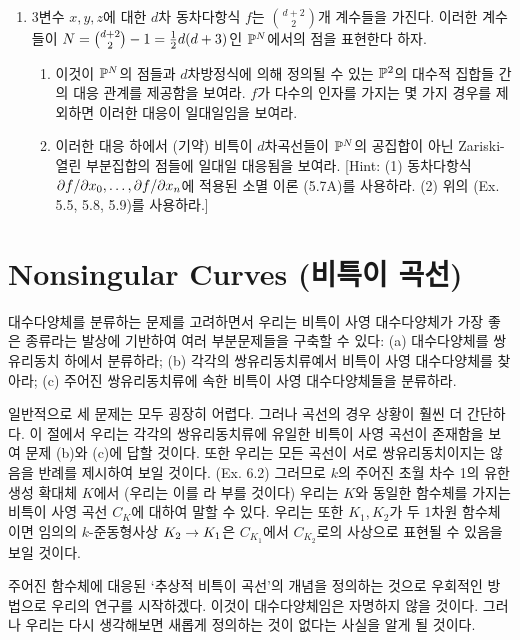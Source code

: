 \begin{enumerate}[label=\tb{5.\arabic*.},itemindent=0mm,itemsep=2mm]
	\item {} 3변수 $x,y,z$에 대한 $d$차 동차다항식 $f$는 $\binom{d+2}2$개 계수들을 가진다.
	이러한 계수들이 $N=\binom{d+2}2-1=\frac{1}{2}d(d+3)$인 $\mathbb{P}^N$에서의 점을 표현한다 하자.
	\begin{enumerate}[label=(\alph*)]
	\item 이것이 $\mathbb{P}^N$의 점들과 $d$차방정식에 의해 정의될 수 있는 $\mathbb{P}^2$의 대수적 집합들 간의 대응 관계를 제공함을 보여라.
	$f$가 다수의 인자를 가지는 몇 가지 경우를 제외하면 이러한 대응이 일대일임을 보여라.
	\item 이러한 대응 하에서 (기약) 비특이 $d$차곡선들이 $\mathbb{P}^N$의 공집합이 아닌 Zariski-열린 부분집합의 점들에
	일대일 대응됨을 보여라. [Hint: (1) 동차다항식 $\partial f/\partial x_0,\ldots,\partial f/\partial x_n$에 적용된 소멸 이론 (5.7A)를 사용하라.
	(2) 위의 (Ex. 5.5, 5.8, 5.9)를 사용하라.]
	\end{enumerate}
	\end{enumerate}
	
	
	
	\section{Nonsingular Curves (비특이 곡선)}
	대수다양체를 분류하는 문제를 고려하면서 우리는 비특이 사영 대수다양체가 가장 좋은 종류라는 발상에 기반하여
	여러 부분문제들을 구축할 수 있다: (a) 대수다양체를 쌍유리동치 하에서 분류하라;
	(b) 각각의 쌍유리동치류예서 비특이 사영 대수다양체를 찾아라; (c) 주어진 쌍유리동치류에 속한 비특이 사영 대수다양체들을 분류하라.
	
	일반적으로 세 문제는 모두 굉장히 어렵다. 그러나 곡선의 경우 상황이 훨씬 더 간단하다.
	이 절에서 우리는 각각의 쌍유리동치류에 유일한 비특이 사영 곡선이 존재함을 보여 문제 (b)와 (c)에 답할 것이다.
	또한 우리는 모든 곡선이 서로 쌍유리동치이지는 않음을 반례를 제시하여 보일 것이다. (Ex. 6.2)
	그러므로 $k$의 주어진 초월 차수 1의 유한생성 확대체 $K$에서%
	(우리는 이를 라 부를 것이다)
	우리는 $K$와 동일한 함수체를 가지는  비특이 사영 곡선 $C_K$에 대하여 말할 수 있다.
	우리는 또한 $K_1,K_2$가 두 1차원 함수체이면 임의의 $k$-준동형사상 $K_2\rightarrow K_1$은
	$C_{K_1}$에서 $C_{K_2}$로의 사상으로 표현될 수 있음을 보일 것이다.
	
	주어진 함수체에 대응된 `추상적 비특이 곡선'의 개념을 정의하는 것으로 우회적인 방법으로 우리의 연구를 시작하겠다.
	이것이 대수다양체임은 자명하지 않을 것이다. 그러나 우리는 다시 생각해보면 새롭게 정의하는 것이 없다는 사실을 알게 될 것이다.
	
